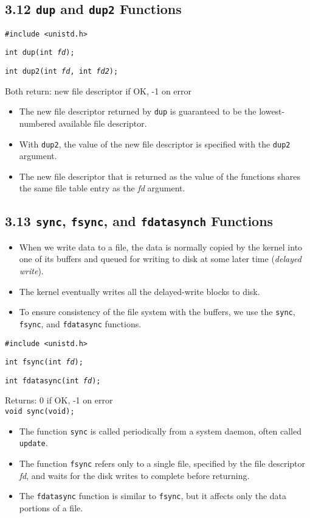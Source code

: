 \documentclass[]{article}
\newcommand{\code}{\texttt}
\begin{document}
\subsection*{3.12 \code{dup} and \code{dup2} Functions}
\code{\#include <unistd.h>}

\code{int dup(int \emph{fd});}

\code{int dup2(int \emph{fd}, int \emph{fd2});}

Both return: new file descriptor if OK, -1 on error

\begin{itemize}
\item The new file descriptor returned by \code{dup} is guaranteed to be the
lowest-numbered available file descriptor.
\item With \code{dup2}, the value of the new file descriptor is specified with
the \code{dup2} argument.
\item The new file descriptor that is returned as the value of the functions
shares the same file table entry as the \emph{fd} argument.
\end{itemize}

\subsection*{3.13 \code{sync}, \code{fsync}, and \code{fdatasynch}
Functions}
\begin{itemize}
\item When we write data to a file, the data is normally copied by the kernel
into one of its buffers and queued for writing to disk at some later time
(\emph{delayed write}).
\item The kernel eventually writes all the delayed-write blocks to disk.
\item To ensure consistency of the file system with the buffers, we use the
\code{sync}, \code{fsync}, and \code{fdatasync} functions.
\end{itemize}

\code{\#include <unistd.h>}

\code{int fsync(int \emph{fd});}

\code{int fdatasync(int \emph{fd});}

Returns: 0 if OK, -1 on error\\

\code{void sync(void);}

\begin{itemize}
\item The function \code{sync} is called periodically from a system daemon,
often called \code{update}.
\item The function \code{fsync} refers only to a single file, specified by the
file descriptor \emph{fd}, and waits for the disk writes to complete before
returning.
\item The \code{fdatasync} function is similar to \code{fsync}, but it affects
only the data portions of a file.
\end{itemize}
\end{document}
